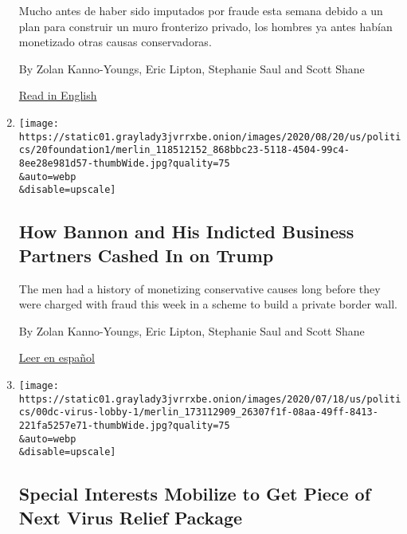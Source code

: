 \begin{enumerate}
  Mucho antes de haber sido imputados por fraude esta semana debido a un
  plan para construir un muro fronterizo privado, los hombres ya antes
  habían monetizado otras causas conservadoras.

  By Zolan Kanno-Youngs, Eric Lipton, Stephanie Saul and Scott Shane

  \href{https://www.nytimes3xbfgragh.onion/2020/08/20/us/politics/bannon-we-build-the-wall.html}{Read
  in English}
\item
  \href{/2020/08/20/us/politics/bannon-we-build-the-wall.html}{}

  \texttt{[image: https://static01.graylady3jvrrxbe.onion/images/2020/08/20/us/politics/20foundation1/merlin\_118512152\_868bbc23-5118-4504-99c4-8ee28e981d57-thumbWide.jpg?quality=75\\\&auto=webp\\\&disable=upscale]}

  \hypertarget{how-bannon-and-his-indicted-business-partners-cashed-in-on-trump}{%
  \subsection{How Bannon and His Indicted Business Partners Cashed In on
  Trump}\label{how-bannon-and-his-indicted-business-partners-cashed-in-on-trump}}

  The men had a history of monetizing conservative causes long before
  they were charged with fraud this week in a scheme to build a private
  border wall.

  By Zolan Kanno-Youngs, Eric Lipton, Stephanie Saul and Scott Shane

  \href{https://www.nytimes3xbfgragh.onion/es/2020/08/21/espanol/estados-unidos/steve-bannon-muro-fraude.html}{Leer
  en español}
\item
  \href{/2020/07/19/us/politics/coronavirus-relief-lobbyists-special-interests.html}{}

  \texttt{[image: https://static01.graylady3jvrrxbe.onion/images/2020/07/18/us/politics/00dc-virus-lobby-1/merlin\_173112909\_26307f1f-08aa-49ff-8413-221fa5257e71-thumbWide.jpg?quality=75\\\&auto=webp\\\&disable=upscale]}

  \hypertarget{special-interests-mobilize-to-get-piece-of-next-virus-relief-package}{%
  \subsection{Special Interests Mobilize to Get Piece of Next Virus
  Relief
  Package}\label{special-interests-mobilize-to-get-piece-of-next-virus-relief-package}}


\end{enumerate}
